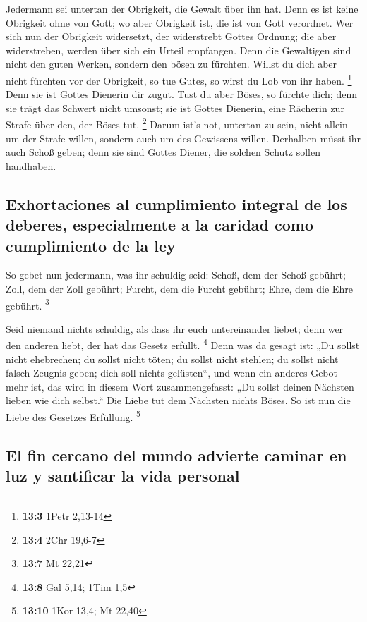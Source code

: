  Jedermann sei untertan der Obrigkeit, die Gewalt über ihn
hat. Denn es ist keine Obrigkeit ohne von Gott; wo aber Obrigkeit ist,
die ist von Gott verordnet.  Wer sich nun der Obrigkeit
widersetzt, der widerstrebt Gottes Ordnung; die aber widerstreben,
werden über sich ein Urteil empfangen.  Denn die
Gewaltigen sind nicht den guten Werken, sondern den bösen zu fürchten.
Willst du dich aber nicht fürchten vor der Obrigkeit, so tue Gutes, so
wirst du Lob von ihr haben. \footnote{\textbf{13:3} 1Petr 2,13-14}
 Denn sie ist Gottes Dienerin dir zugut. Tust du aber
Böses, so fürchte dich; denn sie trägt das Schwert nicht umsonst; sie
ist Gottes Dienerin, eine Rächerin zur Strafe über den, der Böses tut.
\footnote{\textbf{13:4} 2Chr 19,6-7}  Darum ist's not,
untertan zu sein, nicht allein um der Strafe willen, sondern auch um des
Gewissens willen.  Derhalben müsst ihr auch Schoß geben;
denn sie sind Gottes Diener, die solchen Schutz sollen handhaben.

\hypertarget{exhortaciones-al-cumplimiento-integral-de-los-deberes-especialmente-a-la-caridad-como-cumplimiento-de-la-ley}{%
\subsection{Exhortaciones al cumplimiento integral de los deberes,
especialmente a la caridad como cumplimiento de la
ley}\label{exhortaciones-al-cumplimiento-integral-de-los-deberes-especialmente-a-la-caridad-como-cumplimiento-de-la-ley}}

 So gebet nun jedermann, was ihr schuldig seid: Schoß, dem
der Schoß gebührt; Zoll, dem der Zoll gebührt; Furcht, dem die Furcht
gebührt; Ehre, dem die Ehre gebührt. \footnote{\textbf{13:7} Mt 22,21}

 Seid niemand nichts schuldig, als dass ihr euch
untereinander liebet; denn wer den anderen liebt, der hat das Gesetz
erfüllt. \footnote{\textbf{13:8} Gal 5,14; 1Tim 1,5}  Denn
was da gesagt ist: „Du sollst nicht ehebrechen; du sollst nicht töten;
du sollst nicht stehlen; du sollst nicht falsch Zeugnis geben; dich soll
nichts gelüsten``, und wenn ein anderes Gebot mehr ist, das wird in
diesem Wort zusammengefasst: „Du sollst deinen Nächsten lieben wie dich
selbst.``  Die Liebe tut dem Nächsten nichts Böses. So
ist nun die Liebe des Gesetzes Erfüllung. \footnote{\textbf{13:10} 1Kor
  13,4; Mt 22,40}

\hypertarget{el-fin-cercano-del-mundo-advierte-caminar-en-luz-y-santificar-la-vida-personal}{%
\subsection{El fin cercano del mundo advierte caminar en luz y
santificar la vida
personal}\label{el-fin-cercano-del-mundo-advierte-caminar-en-luz-y-santificar-la-vida-personal}}

